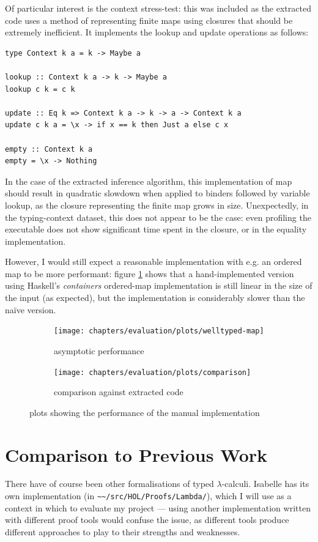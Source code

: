 Of particular interest is the context stress-test: this was included as the extracted code uses a method of representing finite maps using closures that should be extremely inefficient.
It implements the lookup and update operations as follows:

\begin{verbatim}
type Context k a = k -> Maybe a

lookup :: Context k a -> k -> Maybe a
lookup c k = c k

update :: Eq k => Context k a -> k -> a -> Context k a
update c k a = \x -> if x == k then Just a else c x

empty :: Context k a
empty = \x -> Nothing
\end{verbatim}

In the case of the extracted inference algorithm, this implementation of map should result in quadratic slowdown when applied to binders followed by variable lookup, as the closure representing the finite map grows in size.
Unexpectedly, in the typing-context dataset, this does not appear to be the case: even profiling the executable does not show significant time spent in the closure, or in the equality implementation.

However, I would still expect a reasonable implementation with e.g. an ordered map to be more performant: figure \ref{fig:results-map} shows that a hand-implemented version using Haskell's \emph{containers} ordered-map implementation is still linear in the size of the input (as expected), but the implementation is considerably slower than the na\"ive version.

\begin{figure}
\begin{subfigure}{.49\textwidth}
 \centering
 \texttt{[image: chapters/evaluation/plots/welltyped-map]}
 \caption{asymptotic performance}
\end{subfigure}
\begin{subfigure}{.49\textwidth}
 \centering
 \texttt{[image: chapters/evaluation/plots/comparison]}
 \caption{comparison against extracted code}
\end{subfigure}
\caption{plots showing the performance of the manual implementation}
\label{fig:results-map}
\end{figure}

\section{Comparison to Previous Work}
There have of course been other formalisations of typed \(\lambda\)-calculi.
Isabelle has its own implementation (in \texttt{\textasciitilde\textasciitilde/src/HOL/Proofs/Lambda/}), which I will use as a context in which to evaluate my project --- using another implementation written with different proof tools would confuse the issue, as different tools produce different approaches to play to their strengths and weaknesses.

